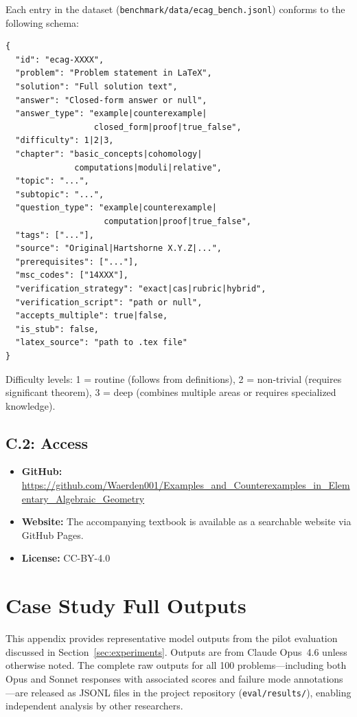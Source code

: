 Each entry in the \ecagbench{} dataset (\texttt{benchmark/data/ecag\_bench.jsonl}) conforms to the following schema:

\begin{lstlisting}
{
  "id": "ecag-XXXX",
  "problem": "Problem statement in LaTeX",
  "solution": "Full solution text",
  "answer": "Closed-form answer or null",
  "answer_type": "example|counterexample|
                  closed_form|proof|true_false",
  "difficulty": 1|2|3,
  "chapter": "basic_concepts|cohomology|
              computations|moduli|relative",
  "topic": "...",
  "subtopic": "...",
  "question_type": "example|counterexample|
                    computation|proof|true_false",
  "tags": ["..."],
  "source": "Original|Hartshorne X.Y.Z|...",
  "prerequisites": ["..."],
  "msc_codes": ["14XXX"],
  "verification_strategy": "exact|cas|rubric|hybrid",
  "verification_script": "path or null",
  "accepts_multiple": true|false,
  "is_stub": false,
  "latex_source": "path to .tex file"
}
\end{lstlisting}

Difficulty levels: 1 = routine (follows from definitions), 2 = non-trivial (requires significant theorem), 3 = deep (combines multiple areas or requires specialized knowledge).

\subsection*{C.2: Access}

\begin{itemize}[nosep]
  \item \textbf{GitHub:} {\small\url{https://github.com/Waerden001/Examples_and_Counterexamples_in_Elementary_Algebraic_Geometry}}
  \item \textbf{Website:} The accompanying textbook is available as a searchable website via GitHub Pages.
  \item \textbf{License:} CC-BY-4.0
\end{itemize}

\section{Case Study Full Outputs}
\label{app:case-studies}

This appendix provides representative model outputs from the pilot evaluation discussed in Section~\ref{sec:experiments}.
Outputs are from Claude Opus~4.6 unless otherwise noted.
The complete raw outputs for all 100 problems---including both Opus and Sonnet responses with associated scores and failure mode annotations---are released as JSONL files in the project repository (\texttt{eval/results/}), enabling independent analysis by other researchers.

